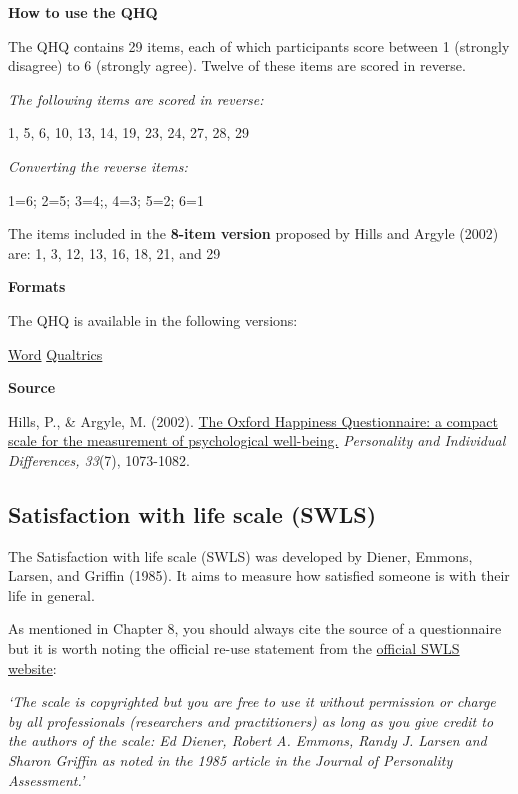 \documentclass[
]{book}
\begin{document}
\textbf{How to use the QHQ}

The QHQ contains 29 items, each of which participants score between 1 (strongly disagree) to 6 (strongly agree). Twelve of these items are scored in reverse.

\emph{The following items are scored in reverse:}

1, 5, 6, 10, 13, 14, 19, 23, 24, 27, 28, 29

\emph{Converting the reverse items:}

1=6; 2=5; 3=4;, 4=3; 5=2; 6=1

The items included in the \textbf{8-item version} proposed by Hills and Argyle (2002) are: 1, 3, 12, 13, 16, 18, 21, and 29

\textbf{Formats}

The QHQ is available in the following versions:

\href{link\%20to\%20file}{Word} \textbar{} \href{link\%20to\%20file}{Qualtrics}

\textbf{Source}

Hills, P., \& Argyle, M. (2002). \href{https://pdfs.semanticscholar.org/cadd/7a4eea79e031ec0cf8b8054f668057f33dda.pdf}{The Oxford Happiness Questionnaire: a compact scale for the measurement of psychological well-being.} \emph{Personality and Individual Differences, 33}(7), 1073-1082.

\hypertarget{satisfaction-with-life-scale-swls}{%
\subsection{Satisfaction with life scale (SWLS)}\label{satisfaction-with-life-scale-swls}}

The Satisfaction with life scale (SWLS) was developed by Diener, Emmons, Larsen, and Griffin (1985). It aims to measure how satisfied someone is with their life in general.

As mentioned in Chapter 8, you should always cite the source of a questionnaire but it is worth noting the official re-use statement from the \href{http://labs.psychology.illinois.edu/~ediener/SWLS.html}{official SWLS website}:

\emph{`The scale is copyrighted but you are free to use it without permission or charge by all professionals (researchers and practitioners) as long as you give credit to the authors of the scale: Ed Diener, Robert A. Emmons, Randy J. Larsen and Sharon Griffin as noted in the 1985 article in the Journal of Personality Assessment.'}
\end{document}
